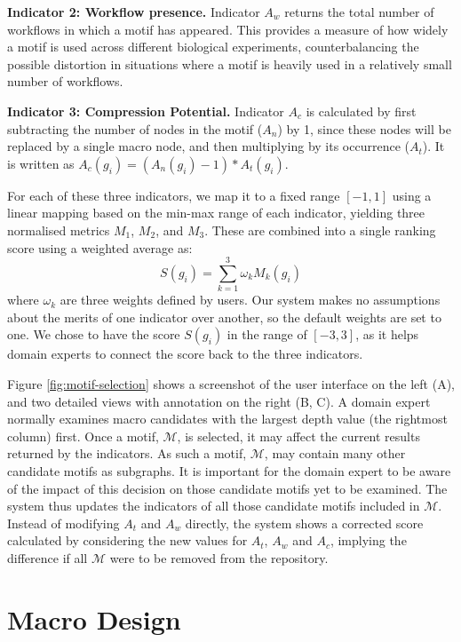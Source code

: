 \noindent \textbf{Indicator 2: Workflow presence.} Indicator $A_w$ returns the total number of workflows in which a motif has appeared.
This provides a measure of how widely a motif is used across different biological experiments, counterbalancing the possible distortion in situations where a motif is heavily used in a relatively small number of workflows. 

\noindent \textbf{Indicator 3: Compression Potential.} Indicator $A_c$ is calculated by first subtracting the number of nodes in the motif ($A_n$) by 1, since these nodes will be replaced by a single macro node, and then multiplying by its occurrence ($A_t$).
It is written as $A_c(g_i) = (A_n(g_i) - 1) * A_t(g_i)$.

For each of these three indicators, we map it to a fixed range $[-1, 1]$ using a linear mapping based on the min-max range of each indicator, yielding three normalised metrics $M_1$, $M_2$, and $M_3$.
These are combined into a single ranking score using a weighted average as:
\[
S(g_i) = \sum_{k=1}^3 \omega_k M_k(g_i)
\]
\noindent where $\omega_k$ are three weights defined by users.
Our system makes no assumptions about the merits of one indicator over another, so the default weights are set to one.
We chose to have the score $S(g_i)$ in the range of $[-3, 3]$, as it helps domain experts to connect the score back to the three indicators.

Figure \ref{fig:motif-selection} shows a screenshot of the user interface on the left (A), and two detailed views with annotation on the right (B, C).
A domain expert normally examines macro candidates with the largest depth value (the rightmost column) first.
Once a motif, $\mathcal{M}$, is selected, it may affect the current results returned by the indicators.
As such a motif, $\mathcal{M}$, may contain many other candidate motifs as subgraphs. It is important for the domain expert to be aware of the impact of this decision on those candidate motifs yet to be examined.
The system thus updates the indicators of all those candidate motifs included in $\mathcal{M}$.
Instead of modifying $A_t$ and $A_w$ directly, the system shows a corrected score calculated by considering the new values for $A_t$, $A_w$ and $A_c$, implying the difference if all $\mathcal{M}$ were to be removed from the repository.

\section{Macro Design}
\label{sec:Design}

